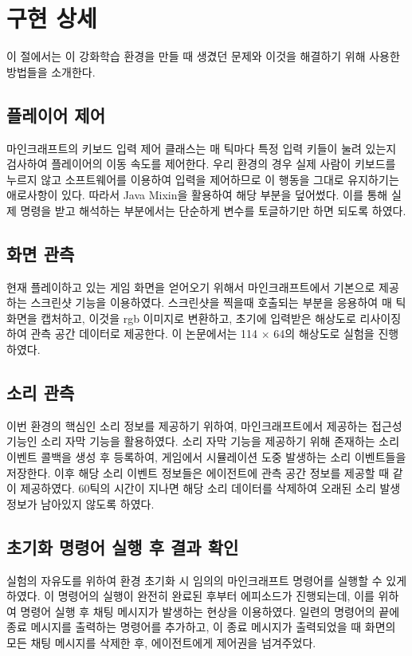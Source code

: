 \documentclass[oneside, under, ko]{snuthesis}
\begin{document}
\section{구현 상세}
이 절에서는 이 강화학습 환경을 만들 때 생겼던 문제와 이것을 해결하기 위해 사용한 방법들을 소개한다.
\subsection{플레이어 제어}
마인크래프트의 키보드 입력 제어 클래스는 매 틱마다 특정 입력 키들이 눌려 있는지 검사하여 플레이어의 이동 속도를 제어한다. 우리 환경의 경우 실제 사람이 키보드를 누르지 않고 소프트웨어를 이용하여 입력을 제어하므로 이 행동을 그대로 유지하기는 애로사항이 있다. 따라서 Java Mixin을 활용하여 해당 부분을 덮어썼다. 이를 통해 실제 명령을 받고 해석하는 부분에서는 단순하게 변수를 토글하기만 하면 되도록 하였다.

\subsection{화면 관측}
현재 플레이하고 있는 게임 화면을 얻어오기 위해서 마인크래프트에서 기본으로 제공하는 스크린샷 기능을 이용하였다. 스크린샷을 찍을때 호출되는 부분을 응용하여 매 틱 화면을 캡처하고, 이것을 rgb 이미지로 변환하고, 초기에 입력받은 해상도로 리사이징하여 관측 공간 데이터로 제공한다. 이 논문에서는 114 $\times$ 64의 해상도로 실험을 진행하였다.

\subsection{소리 관측}
이번 환경의 핵심인 소리 정보를 제공하기 위하여, 마인크래프트에서 제공하는 접근성 기능인 소리 자막 기능을 활용하였다. 소리 자막 기능을 제공하기 위해 존재하는 소리 이벤트 콜백을 생성 후 등록하여, 게임에서 시뮬레이션 도중 발생하는 소리 이벤트들을 저장한다. 이후 해당 소리 이벤트 정보들은 에이전트에 관측 공간 정보를 제공할 때 같이 제공하였다. 60틱의 시간이 지나면 해당 소리 데이터를 삭제하여 오래된 소리 발생 정보가 남아있지 않도록 하였다.

\subsection{초기화 명령어 실행 후 결과 확인}
실험의 자유도를 위하여 환경 초기화 시 임의의 마인크래프트 명령어를 실행할 수 있게 하였다. 이 명령어의 실행이 완전히 완료된 후부터 에피소드가 진행되는데, 이를 위하여 명령어 실행 후 채팅 메시지가 발생하는 현상을 이용하였다. 일련의 명령어의 끝에 종료 메시지를 출력하는 명령어를 추가하고, 이 종료 메시지가 출력되었을 때 화면의 모든 채팅 메시지를 삭제한 후, 에이전트에게 제어권을 넘겨주었다.
\end{document}
